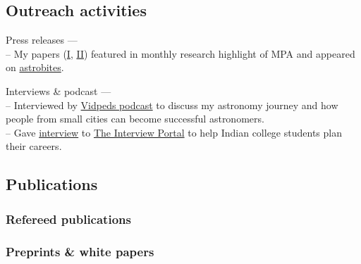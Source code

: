 \documentclass[12pt,letterpaper]{article}
\begin{document}
\subsection{Outreach activities}
\begin{list}{}{\cvlist}
    \item Press releases --- \\
        -- My papers (\href{https://www.mpa-garching.mpg.de/964620/hl202107}{I}, \href{https://www.mpa-garching.mpg.de/1066558/hl202211?c=27981}{II}) featured in monthly research highlight of MPA and appeared on \href{https://astrobites.org/2021/05/06/cool-metal-gas-search-thanks-it-was-automated/}{astrobites}.
    \item Interviews \& podcast --- \\
      -- Interviewed by \href{https://www.youtube.com/watch?v=WmA_PnYLeCg}{Vidpeds podcast} to discuss my astronomy journey and how people from small cities can become successful astronomers. \\
      -- Gave \href{https://theinterviewportal.com/2020/03/13/astrophysicist-interview-8/}{interview} to \href{https://theinterviewportal.com/}{The Interview Portal} to help Indian college students plan their careers.
  \end{list}

\ifdefined\withpubs
  \subsection{Publications}
  

\subsubsection{Refereed publications}
\begin{list}{}{\cvlist}
  
\end{list}

\subsubsection{Preprints \& white papers}
\begin{list}{}{\cvlist}
  
\end{list}
\fi
\end{document}
